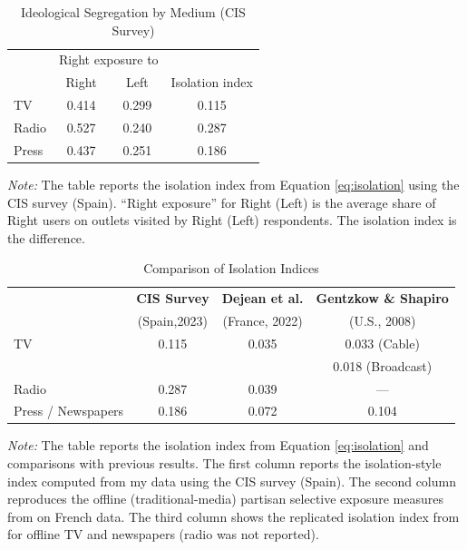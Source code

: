 \documentclass[12pt]{article}
\begin{document}
	
	\begin{table}[!htb]
		\caption{Ideological Segregation by Medium (CIS Survey)}
		\label{tab:isolation_table}
		
		\centering
		\begin{tabular}{lccc}
			\hline
			& \multicolumn{2}{c}{Right exposure to } & \\
			\cline{2-3}
			& Right & Left & Isolation index \\
			\hline
			TV    & 0.414 & 0.299 & 0.115 \\
			Radio & 0.527 & 0.240 & 0.287 \\
			Press & 0.437 & 0.251 & 0.186 \\
			\hline
		\end{tabular}
		
		\begin{tablenotes}
			\small
			\item \textit{Note:} The table reports the isolation index from Equation \ref{eq:isolation}  using the CIS survey (Spain). “Right exposure” for Right (Left) is the average share of Right users on outlets visited by Right (Left) respondents. The isolation index is the difference.
		\end{tablenotes}
	\end{table}
	
	
	
	
	\begin{table}[!htb]
		\caption{Comparison of Isolation Indices}
		\label{tab:isolation_table_compare}
		\centering
		\begin{tabular}{lccc}
			\hline
 & \textbf{CIS Survey} & \textbf{Dejean et al.} & \textbf{Gentzkow \& Shapiro} \\
			&  (Spain,2023) & (France, 2022) &  (U.S., 2008) \\
			\hline
			TV & 0.115 & 0.035 & 0.033 \scriptsize{(Cable)}\\
						 &  &  & \hspace{0.45cm} 0.018 \scriptsize{(Broadcast)} \\
			Radio & 0.287 & 0.039 & — \\
			Press / Newspapers & 0.186 & 0.072 & 0.104\\
			\hline
		\end{tabular}
		\begin{tablenotes}
			\small
			\item \textit{Note:} The table reports the isolation index from Equation \ref{eq:isolation} and comparisons with previous results. 
			The first column reports the isolation-style index computed from my data using the CIS survey (Spain).
			The second column reproduces the offline (traditional-media) partisan selective exposure measures from \cite{Dejean2022PartisanSE} on French data. 
			The third column shows the replicated isolation index from \cite{gentzkow_isolation} for offline TV and newspapers (radio was not reported).
		\end{tablenotes}
	\end{table}
	
\end{document}
